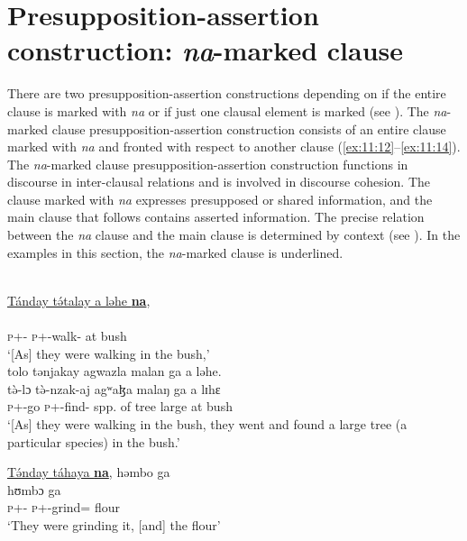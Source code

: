 \section{Presupposition-assertion construction: \textit{na}-marked clause}\label{sec:11.1}
\hypertarget{RefHeading1213161525720847}{}
There are two presupposition-assertion constructions depending on if the entire clause is marked with \textit{na} or if just one clausal element is marked (see ). The \textit{na}{}-marked clause presupposition-assertion construction consists of an entire clause marked with \textit{na}  and fronted with respect to another clause (\ref{ex:11:12}--\ref{ex:11:14}).  The \textit{na}{}-marked clause presupposition-assertion construction functions in discourse in inter-clausal relations and is involved in discourse cohesion. The clause marked with \textit{na} expresses presupposed or shared information, and the main clause that follows contains asserted information. The precise relation between the \textit{na} clause and the main clause is determined by context (see ).  In the examples in this section, the \textit{na}-marked clause is underlined. 

\ea \label{ex:11:12}
\\
\underline{Tánday  t\'ətalay  a  ləhe  \textbf{na}},\\  
\gll  {}      \\ 
      \textsc{p}+{\IFV}-{\PRG} \textsc{p}+{\IFV}-walk{}-{\CL} at bush {\PSP}\\  
\glt ‘[As] they were walking in the bush,’\\
      
      \medskip
tolo  tənjakay  agwazla  malan  ga  a  ləhe.\\      
\gll t\`{ə}-lɔ t\`{ə}-nzak-aj agʷaɮa malaŋ ga a lɪhɛ\\
     \textsc{p}+{\PFV}-go \textsc{p}+{\PFV}-find{}-{\CL} {spp. of tree}  large {\ADJ} at bush\\
\glt  ‘[As] they were walking in the bush, they went and found a large tree (a particular species) in the bush.’
\z

\ea \label{ex:11:13}
\underline{T\'ənday  táhaya  \textbf{na}},  həmbo  ga\\ 
\gll  {}   hʊmbɔ  ga \\ 
      \textsc{p}+{\IFV}-{\PRG}  \textsc{p}+{\IFV}-grind={\PLU}    {\PSP}     flour   {\ADJ} \\ 
\glt ‘They were grinding it, [and] the flour’ \\     
      
